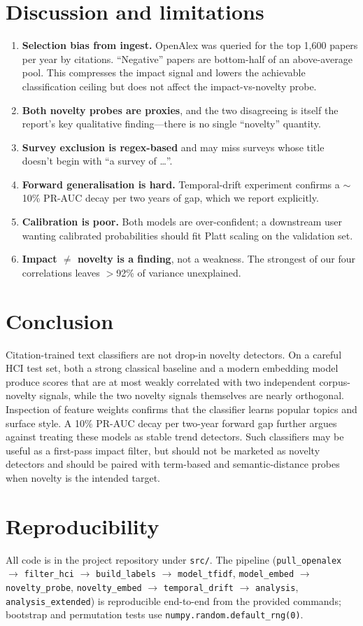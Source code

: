 \documentclass[11pt]{article}
\begin{document}
\section{Discussion and limitations}
\begin{enumerate}
  \item \textbf{Selection bias from ingest.} OpenAlex was queried for the top 1{,}600 papers per year by citations. ``Negative'' papers are bottom-half of an above-average pool. This compresses the impact signal and lowers the achievable classification ceiling but does not affect the impact-vs-novelty probe.
  \item \textbf{Both novelty probes are proxies}, and the two disagreeing is itself the report's key qualitative finding---there is no single ``novelty'' quantity.
  \item \textbf{Survey exclusion is regex-based} and may miss surveys whose title doesn't begin with ``a survey of \dots''.
  \item \textbf{Forward generalisation is hard.} Temporal-drift experiment confirms a $\sim$10\% PR-AUC decay per two years of gap, which we report explicitly.
  \item \textbf{Calibration is poor.} Both models are over-confident; a downstream user wanting calibrated probabilities should fit Platt scaling on the validation set.
  \item \textbf{Impact $\ne$ novelty is a finding}, not a weakness. The strongest of our four correlations leaves $>$92\% of variance unexplained.
\end{enumerate}

\section{Conclusion}
Citation-trained text classifiers are not drop-in novelty detectors. On a careful HCI test set, both a strong classical baseline and a modern embedding model produce scores that are at most weakly correlated with two independent corpus-novelty signals, while the two novelty signals themselves are nearly orthogonal. Inspection of feature weights confirms that the classifier learns popular topics and surface style. A 10\% PR-AUC decay per two-year forward gap further argues against treating these models as stable trend detectors. Such classifiers may be useful as a first-pass impact filter, but should not be marketed as novelty detectors and should be paired with term-based and semantic-distance probes when novelty is the intended target.

\section{Reproducibility}
All code is in the project repository under \texttt{src/}. The pipeline (\texttt{pull\_openalex} $\to$ \texttt{filter\_hci} $\to$ \texttt{build\_labels} $\to$ \texttt{model\_tfidf}, \texttt{model\_embed} $\to$ \texttt{novelty\_probe}, \texttt{novelty\_embed} $\to$ \texttt{temporal\_drift} $\to$ \texttt{analysis}, \texttt{analysis\_extended}) is reproducible end-to-end from the provided commands; bootstrap and permutation tests use \texttt{numpy.random.default\_rng(0)}.
\end{document}
